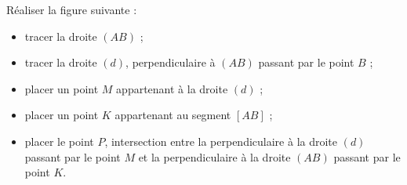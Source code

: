 \begin{exercice*}
   Réaliser la figure suivante :
   \begin{itemize}
      \item tracer la droite $(AB)$ ;
      \item tracer la droite $(d)$, perpendiculaire à $(AB)$ passant par le point $B$ ;
      \item placer un point $M$ appartenant à la droite $(d)$ ;
      \item placer un point $K$ appartenant au segment $[AB]$ ;
      \item placer le point $P$, intersection entre la perpendiculaire à la droite $(d)$ passant par le point $M$ et la perpendiculaire à la droite $(AB)$ passant par le point $K$.
   \end{itemize}
\end{exercice*}
 